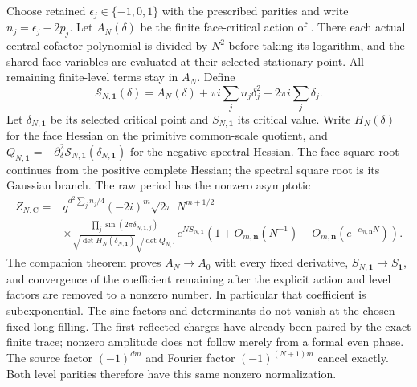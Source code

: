 \documentclass[11pt]{article}
\numberwithin{equation}{section}
\begin{document}
Choose retained \(\epsilon_j\in\{-1,0,1\}\) with the prescribed parities
and write \(n_j=\epsilon_j-2p_j\). Let \(A_N(\delta)\) be the finite
face-critical action of \cite[Sections 10 and 12]{CasimirSources}.
There each actual central cofactor polynomial is divided by \(N^2\)
before taking its logarithm, and the shared face variables are evaluated
at their selected stationary point. All remaining finite-level terms
stay in \(A_N\). Define
\[
 \mathcal S_{N,\mathbf1}(\delta)
 =A_N(\delta)+\pi i\sum_j n_j\delta_j^2+2\pi i\sum_j\delta_j.
\]
Let \(\delta_{N,\mathbf1}\) be its selected critical point and
\(S_{N,\mathbf1}\) its critical value. Write \(H_N(\delta)\) for
the face Hessian on the primitive common-scale quotient, and
\(Q_{N,\mathbf1}=-\partial_\delta^2\mathcal S_{N,\mathbf1}
(\delta_{N,\mathbf1})\) for the negative spectral Hessian. The face
square root continues from the positive complete Hessian; the spectral
square root is its Gaussian branch. The raw period has the nonzero
asymptotic \begin{equation}\label{source:eq-A36}
\begin{split}
 Z_{N,\mathrm C}={}&q^{d^2\sum_jn_j/4}(-2i)^m\sqrt{2\pi}\,N^{m+1/2}\\
 &\times\frac{\prod_j\sin(2\pi\delta_{N,\mathbf1,j})}
 {\sqrt{\det H_N(\delta_{N,\mathbf1})}\sqrt{\det Q_{N,\mathbf1}}}
 e^{N S_{N,\mathbf1}}
 \left(1+O_{m,\mathbf n}(N^{-1})
           +O_{m,\mathbf n}(e^{-c_{m,\mathbf n}N})\right).
\end{split}
\end{equation} The companion theorem proves \(A_N\to A_0\) with every
fixed derivative, \(S_{N,\mathbf1}\to S_{\mathbf1}\), and convergence
of the coefficient remaining after the explicit action and level
factors are removed to a nonzero number. In particular that coefficient
is subexponential. The sine
factors and determinants do not vanish at the chosen fixed long filling.
The first reflected charges have already been paired by the exact finite
trace; nonzero amplitude does not follow merely from a formal even
phase. The source factor \((-1)^{dm}\) and Fourier factor
\((-1)^{(N+1)m}\) cancel exactly. Both level parities therefore have
this same nonzero normalization.
\end{document}
